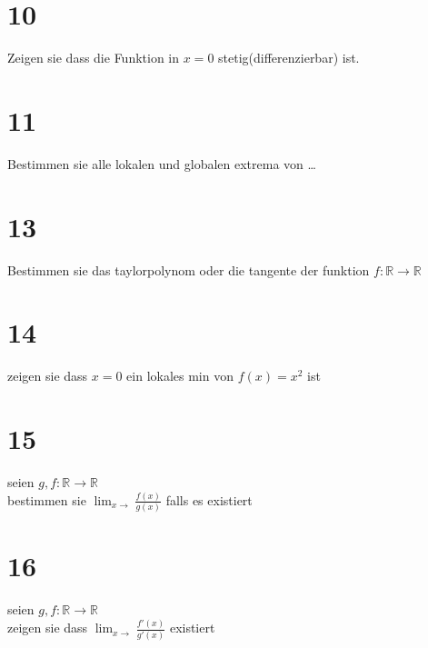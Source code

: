 \documentclass[11pt,oneside,a4paper]{scrartcl}
\begin{document}
\section*{10}
Zeigen sie dass die Funktion in $x=0$ stetig(differenzierbar) ist.
\section*{11}
Bestimmen sie alle lokalen und globalen extrema von \dots
\section*{13}
Bestimmen sie das taylorpolynom oder die tangente der funktion $f:\mathbb{R}\rightarrow\mathbb{R}$ 
\section*{14}
zeigen sie dass $x=0$ ein lokales min von $f(x)=x^2$ ist
\section*{15}
seien $g,f :\mathbb{R} \rightarrow \mathbb{R}$\\
bestimmen sie $\lim_{x\to}\frac{f(x)}{g(x)}$ falls es existiert
\section*{16}%
seien $g,f :\mathbb{R} \rightarrow \mathbb{R}$\\
zeigen sie dass $\lim_{x\to}\frac{f'(x)}{g'(x)}$ existiert
\end{document}
